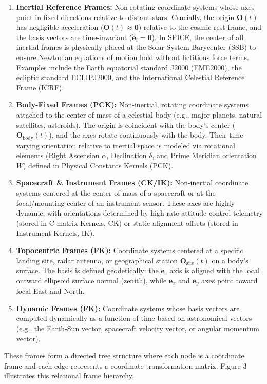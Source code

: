 \documentclass{acta}
\begin{document}
\begin{enumerate}
\item {\bf Inertial Reference Frames:} Non-rotating coordinate systems whose axes point in fixed directions relative to distant stars. Crucially, the origin $\mathbf{O}(t)$ has negligible acceleration ($\ddot{\mathbf{O}}(t) \approx \mathbf{0}$) relative to the cosmic rest frame, and the basis vectors are time-invariant ($\dot{\mathbf{e}}_i = \mathbf{0}$). In SPICE, the center of all inertial frames is physically placed at the Solar System Barycenter (SSB) to ensure Newtonian equations of motion hold without fictitious force terms. Examples include the Earth equatorial standard J2000 (EME2000), the ecliptic standard ECLIPJ2000, and the International Celestial Reference Frame (ICRF).
\item {\bf Body-Fixed Frames (PCK):} Non-inertial, rotating coordinate systems attached to the center of mass of a celestial body (e.g., major planets, natural satellites, asteroids). The origin is coincident with the body's center ($\mathbf{O}_{\text{body}}(t)$), and the axes rotate continuously with the body. Their time-varying orientation relative to inertial space is modeled via rotational elements (Right Ascension $\alpha$, Declination $\delta$, and Prime Meridian orientation $W$) defined in Physical Constants Kernels (PCK).
\item {\bf Spacecraft \& Instrument Frames (CK/IK):} Non-inertial coordinate systems centered at the center of mass of a spacecraft or at the focal/mounting center of an instrument sensor. These axes are highly dynamic, with orientations determined by high-rate attitude control telemetry (stored in C-matrix Kernels, CK) or static alignment offsets (stored in Instrument Kernels, IK).
\item {\bf Topocentric Frames (FK):} Coordinate systems centered at a specific landing site, radar antenna, or geographical station $\mathbf{O}_{\text{site}}(t)$ on a body's surface. The basis is defined geodetically: the $\mathbf{e}_z$ axis is aligned with the local outward ellipsoid surface normal (zenith), while $\mathbf{e}_x$ and $\mathbf{e}_y$ axes point toward local East and North.
\item {\bf Dynamic Frames (FK):} Coordinate systems whose basis vectors are computed dynamically as a function of time based on astronomical vectors (e.g., the Earth-Sun vector, spacecraft velocity vector, or angular momentum vector).
\end{enumerate}

These frames form a directed tree structure where each node is a coordinate frame and each edge represents a coordinate transformation matrix. Figure 3 illustrates this relational frame hierarchy.
\end{document}
